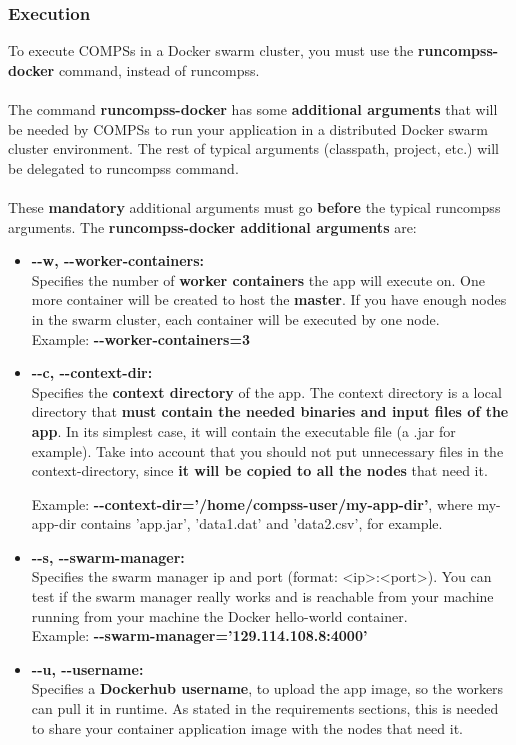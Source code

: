 \subsubsection{Execution}
To execute COMPSs in a Docker swarm cluster, you must use the \textbf{runcompss-docker} command, instead of runcompss.
\\ \\
The command \textbf{runcompss-docker} has some \textbf{additional arguments} that will be needed by COMPSs to run your application 
in a distributed Docker swarm cluster environment.
The rest of typical arguments (classpath, project, etc.) will be delegated to runcompss command.
\\ \\
These \textbf{mandatory} additional arguments must go \textbf{before} the typical runcompss arguments. 
The \textbf{runcompss-docker additional arguments} are:
\begin{itemize}
 \item { 
 \textbf{-{}-w, -{}-worker-containers:} \\  
 Specifies the number of \textbf{worker containers} the app will execute on. One more container will be created to host the \textbf{master}. 
 If you have enough nodes in the swarm cluster, each container will be executed by one node.\\
 Example:  \textbf{-{}-worker-containers=3}
 }
 
 \item { 
 \textbf{-{}-c, -{}-context-dir:} \\
 Specifies the \textbf{context directory} of the app. 
 The context directory is a local directory that \textbf{must contain the needed binaries and input files of the app}.
 In its simplest case, it will contain the executable file (a .jar for example).
 Take into account that you should not put unnecessary files in the context-directory, 
 since \textbf{it will be copied to all the nodes} that need it.
 
 Example: \textbf{-{}-context-dir='/home/compss-user/my-app-dir'}, where my-app-dir contains 'app.jar', 'data1.dat' and 'data2.csv', for example.
 }

 \item { 
 \textbf{-{}-s, -{}-swarm-manager:} \\
 Specifies the swarm manager ip and port (format: <ip>:<port>). 
 You can test if the swarm manager really works and is reachable from your machine
 running from your machine the Docker hello-world container.\\
 Example: \textbf{-{}-swarm-manager='129.114.108.8:4000'}
 }
 
 \item { 
 \textbf{-{}-u, -{}-username:} \\
 Specifies a \textbf{Dockerhub username}, to upload the app image, so the workers can pull it in runtime. 
 As stated in the requirements sections, this is needed to share your container application image with the nodes that need it.
 }
\end{itemize}

